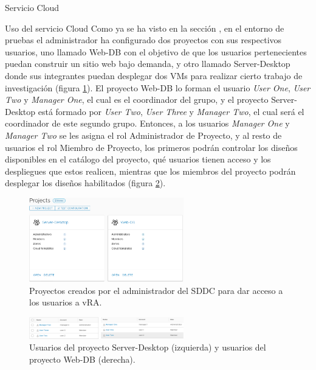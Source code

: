 \begin{subsection}{Servicio Cloud}
\begin{subsubsection}{Uso del servicio Cloud}
        Como ya se ha visto en la sección , en el entorno de pruebas el administrador ha configurado dos proyectos con sus respectivos usuarios, uno llamado Web-DB con el objetivo de que los usuarios pertenecientes puedan construir un sitio web bajo demanda, y otro llamado Server-Desktop donde sus integrantes puedan desplegar dos VMs para realizar cierto trabajo de investigación (figura \ref{fig:projects-vra}). El proyecto Web-DB lo forman el usuario \textit{User One}, \textit{User Two} y \textit{Manager One}, el cual es el coordinador del grupo, y el proyecto Server-Desktop está formado por \textit{User Two}, \textit{User Three} y \textit{Manager Two}, el cual será el coordinador de este segundo grupo. Entonces, a los usuarios \textit{Manager One} y \textit{Manager Two} se les asigna el rol Administrador de Proyecto, y al resto de usuarios el rol Miembro de Proyecto, los primeros podrán controlar los diseños disponibles en el catálogo del proyecto, qué usuarios tienen acceso y los despliegues que estos realicen, mientras que los miembros del proyecto podrán desplegar los diseños habilitados (figura \ref{fig:project-users}).
        \begin{figure}[h]
            \centering
            \includegraphics[width=0.6\textwidth]{imaxes/pruebaconcepto/vrealize/projects-vRA.png}
            \caption{Proyectos creados por el administrador del SDDC para dar acceso a los usuarios a vRA.}
            \label{fig:projects-vra}
        \end{figure}
        \FloatBarrier
        \begin{figure}[h]
            \centering
            \includegraphics[width=0.6\textwidth]{imaxes/pruebaconcepto/vrealize/users-DB.png}
            \caption{Usuarios del proyecto Server-Desktop (izquierda) y usuarios del proyecto Web-DB (derecha).}
            \label{fig:project-users}
        \end{figure}

\end{subsubsection}
\end{subsection}
